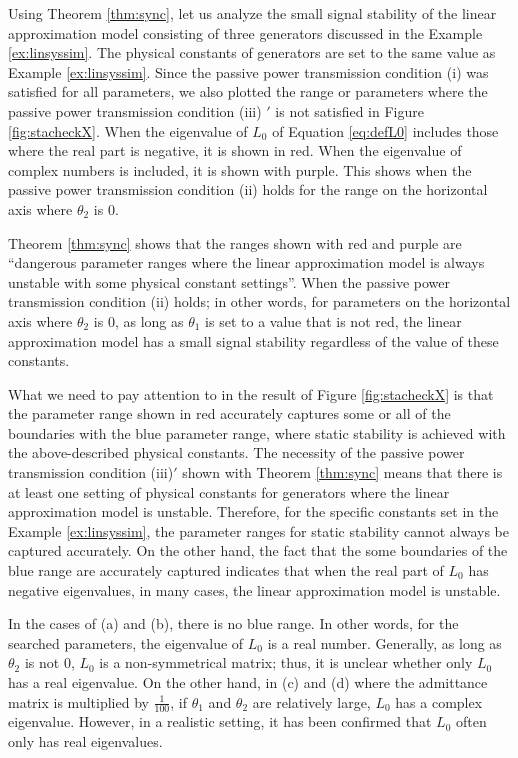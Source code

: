 \documentclass[graybox, envcountchap]{svmult}
\begin{document}
\begin{example}\label{ex:linthm}
Using Theorem \ref{thm:sync}, let us analyze the small signal stability of the linear approximation model consisting of three generators discussed in the Example \ref{ex:linsyssim}.
The physical constants of generators are set to the same value as Example \ref{ex:linsyssim}.
Since the passive power transmission condition (i) was satisfied for all parameters, we also plotted the range or parameters where the passive power transmission condition (iii) $'$ is not satisfied in Figure \ref{fig:stacheckX}.
When the eigenvalue of $L_0$ of Equation \ref{eq:defL0} includes those where the real part is negative, it is shown in red.
When the eigenvalue of complex numbers is included, it is shown with purple.
This shows when the passive power transmission condition (ii) holds for the range on the horizontal axis where $\theta_2$ is 0.

Theorem \ref{thm:sync} shows that the ranges shown with red and purple are “dangerous parameter ranges where the linear approximation model is always unstable with some physical constant settings”.
When the passive power transmission condition (ii) holds; in other words, for parameters on the horizontal axis where $\theta_2$ is 0, as long as $\theta_1$ is set to a value that is not red, the linear approximation model has a small signal stability regardless of the value of these constants.

What we need to pay attention to in the result of Figure \ref{fig:stacheckX} is that the parameter range shown in red accurately captures some or all of the boundaries with the blue parameter range, where static stability is achieved with the above-described physical constants.
The necessity of the passive power transmission condition (iii)$'$ shown with Theorem \ref{thm:sync} means that there is at least one setting of physical constants for generators where the linear approximation model is unstable.
Therefore, for the specific constants set in the Example \ref{ex:linsyssim}, the parameter ranges for static stability cannot always be captured accurately.
On the other hand, the fact that the some boundaries of the blue range are accurately captured indicates that when the real part of $L_0$ has negative eigenvalues, in many cases, the linear approximation model is unstable.

In the cases of (a) and (b), there is no blue range.
In other words, for the searched parameters, the eigenvalue of $L_0$ is a real number.
Generally, as long as $\theta_2$ is not 0, $L_0$ is a non-symmetrical matrix; thus, it is unclear whether only $L_0$ has a real eigenvalue.
On the other hand, in (c) and (d) where the admittance matrix is multiplied by $\tfrac{1}{100}$, if $\theta_1$ and $\theta_2$ are relatively large, $L_0$ has a complex eigenvalue.
However, in a realistic setting, it has been confirmed that $L_0$ often only has real eigenvalues.
\end{example}
\end{document}
